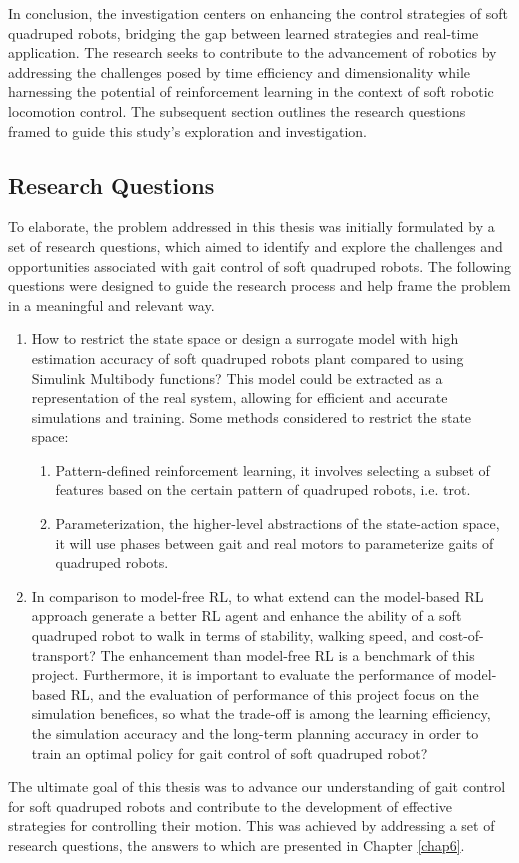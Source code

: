 In conclusion, the investigation centers on enhancing the control strategies of soft quadruped robots, bridging the gap between learned strategies and real-time application. The research seeks to contribute to the advancement of robotics by addressing the challenges posed by time efficiency and dimensionality while harnessing the potential of reinforcement learning in the context of soft robotic locomotion control. The subsequent section outlines the research questions framed to guide this study's exploration and investigation.
\subsection*{Research Questions}
To elaborate, the problem addressed in this thesis was initially formulated by a set of research questions, which aimed to identify and explore the challenges and opportunities associated with gait control of soft quadruped robots. The following questions were designed to guide the research process and help frame the problem in a meaningful and relevant way.
\begin{enumerate}
    \item \label{rq1}How to restrict the state space or design a surrogate model with high estimation accuracy of soft quadruped robots plant compared to using Simulink Multibody functions? This model could be extracted as a representation of the real system, allowing for efficient and accurate simulations and training. Some methods considered to restrict the state space:
    \begin{enumerate}
        \item Pattern-defined reinforcement learning, it involves selecting a subset of features based on the certain pattern of quadruped robots, i.e. trot.
        \item Parameterization, the higher-level abstractions of the state-action space, it will use phases between gait and real motors to parameterize gaits of quadruped robots.
    \end{enumerate}
    \item \label{rq2}In comparison to model-free \ac{RL}, to what extend can the model-based \ac{RL} approach generate a better \ac{RL} agent and enhance the ability of a soft quadruped robot to walk in terms of stability, walking speed, and cost-of-transport? The enhancement than model-free \ac{RL} is a benchmark of this project. Furthermore, it is important to evaluate the performance of model-based \ac{RL}, and the evaluation of performance of this project focus on the simulation benefices, so what the trade-off is among the learning efficiency, the simulation accuracy and the long-term planning accuracy in order to train an optimal policy for gait control of soft quadruped robot?
\end{enumerate}
The ultimate goal of this thesis was to advance our understanding of gait control for soft quadruped robots and contribute to the development of effective strategies for controlling their motion. This was achieved by addressing a set of research questions, the answers to which are presented in Chapter \ref{chap6}. 

